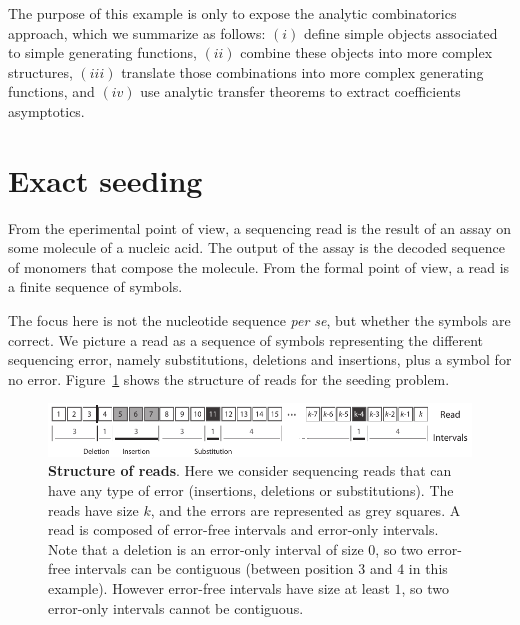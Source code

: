 \documentclass{article}
\begin{document}
The purpose of this example is only to expose the analytic combinatorics
approach, which we summarize as follows: $(i)$ define simple objects
associated to simple generating functions, $(ii)$ combine these objects
into more complex structures, $(iii)$ translate those combinations into
more complex generating functions, and $(iv)$ use analytic transfer
theorems to extract coefficients asymptotics.











\section{Exact seeding}

From the eperimental point of view, a sequencing read is the result of an
assay on some molecule of a nucleic acid. The output of the assay is the
decoded sequence of monomers that compose the molecule. From the formal
point of view, a read is a finite sequence of symbols.

The focus here is not the nucleotide sequence \textit{per se}, but whether
the symbols are correct. We picture a read as a sequence of symbols
representing the different sequencing error, namely substitutions,
deletions and insertions, plus a symbol for no error.
Figure~\ref{fig:sketchseed} shows the structure of reads for the seeding
problem.

\begin{figure}[h]
\centering
\includegraphics[scale=0.88]{sketch_seeding.pdf}
\caption{\textbf{Structure of reads}. Here we consider sequencing reads
that can have any type of error (insertions, deletions or substitutions).
The reads have size $k$, and the errors are represented as grey squares. A
read is composed of error-free intervals and error-only intervals. Note
that a deletion is an error-only interval of size $0$, so two error-free
intervals can be contiguous (between position $3$ and $4$ in this
example). However error-free intervals have size at least $1$, so two
error-only intervals cannot be contiguous.}
\label{fig:sketchseed}
\end{figure}
\end{document}
